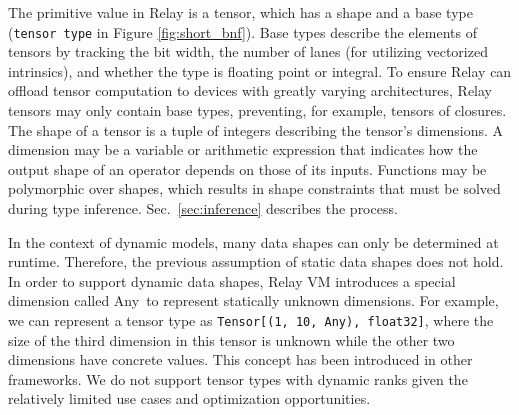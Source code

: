 The primitive value in Relay is a tensor, which has
  a shape and a base type (\verb|tensor type| in Figure \ref{fig:short_bnf}).
Base types describe the elements of tensors by tracking
  the bit width,
  the number of lanes (for utilizing vectorized intrinsics),
  and whether the type is floating point or integral.
To ensure Relay can offload tensor computation to devices
  with greatly varying architectures,
  Relay tensors may only contain base types,
  preventing, for example, tensors of closures.
The shape of a tensor is a tuple of integers describing the tensor's dimensions.
A dimension may be a variable or arithmetic expression that indicates how the
  output shape of an operator depends on those of its inputs.
Functions may be polymorphic over shapes, which results
  in shape constraints that must be solved during type inference.
Sec.~\ref{sec:inference} describes the process.

In the context of dynamic models, many data shapes can only be determined at runtime.
Therefore, the previous assumption of static data shapes does not hold.
In order to support dynamic data shapes, Relay VM introduces a special dimension called
  Any~to represent statically unknown dimensions.
For example, we can represent a tensor type as \texttt{Tensor[(1, 10, Any), float32]},
  where the size of the third dimension in this tensor is unknown while the other
  two dimensions have concrete values.
This concept has been introduced in other frameworks.
We do not support tensor types with dynamic ranks given the relatively limited use cases and optimization opportunities.

